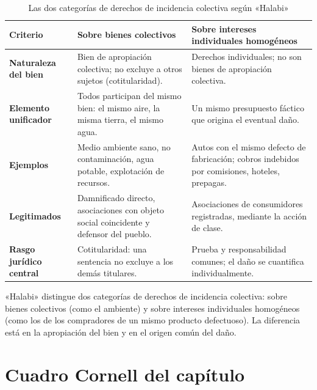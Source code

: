 \documentclass[12pt,oneside]{book}
\begin{document}
\begin{table}[H]
\centering
\caption{Las dos categorías de derechos de incidencia colectiva según «Halabi»}
\renewcommand{\arraystretch}{1.25}
\begin{tabularx}{\textwidth}{>{\raggedright\arraybackslash}p{} >{\raggedright\arraybackslash}X >{\raggedright\arraybackslash}X}
\toprule
\textbf{Criterio} & \textbf{Sobre bienes colectivos} & \textbf{Sobre intereses individuales homogéneos} \\
\midrule
\textbf{Naturaleza del bien} & Bien de apropiación colectiva; no excluye a otros sujetos (cotitularidad). & Derechos individuales; no son bienes de apropiación colectiva. \\
\textbf{Elemento unificador} & Todos participan del mismo bien: el mismo aire, la misma tierra, el mismo agua. & Un mismo presupuesto fáctico que origina el eventual daño. \\
\textbf{Ejemplos} & Medio ambiente sano, no contaminación, agua potable, explotación de recursos. & Autos con el mismo defecto de fabricación; cobros indebidos por comisiones, hoteles, prepagas. \\
\textbf{Legitimados} & Damnificado directo, asociaciones con objeto social coincidente y defensor del pueblo. & Asociaciones de consumidores registradas, mediante la acción de clase. \\
\textbf{Rasgo jurídico central} & Cotitularidad: una sentencia no excluye a los demás titulares. & Prueba y responsabilidad comunes; el daño se cuantifica individualmente. \\
\bottomrule
\end{tabularx}
\end{table}

\begin{important}
«Halabi» distingue dos categorías de derechos de incidencia colectiva: sobre bienes colectivos (como el ambiente) y sobre intereses individuales homogéneos (como los de los compradores de un mismo producto defectuoso). La diferencia está en la apropiación del bien y en el origen común del daño.
\end{important}

\section{Cuadro Cornell del capítulo}
\end{document}
